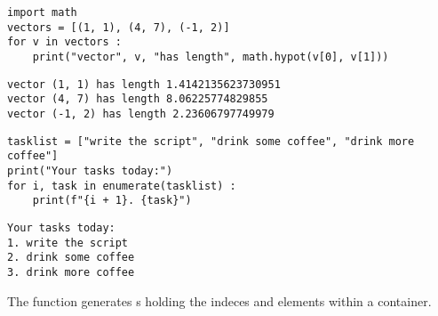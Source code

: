 
\begin{frame}[fragile]
%
\begin{codebox}
\begin{verbatim}
import math
vectors = [(1, 1), (4, 7), (-1, 2)]
for v in vectors :
    print("vector", v, "has length", math.hypot(v[0], v[1]))
\end{verbatim}
\end{codebox}
%
\begin{cmdbox}
\begin{verbatim}
vector (1, 1) has length 1.4142135623730951
vector (4, 7) has length 8.06225774829855
vector (-1, 2) has length 2.23606797749979
\end{verbatim}
\end{cmdbox}
%
\end{frame}


\begin{frame}[fragile]
%
\begin{codebox}
\begin{verbatim}
tasklist = ["write the script", "drink some coffee", "drink more coffee"]
print("Your tasks today:")
for i, task in enumerate(tasklist) :
    print(f"{i + 1}. {task}")
\end{verbatim}
\end{codebox}
%
\begin{cmdbox}
\begin{verbatim}
Your tasks today:
1. write the script
2. drink some coffee
3. drink more coffee
\end{verbatim}
\end{cmdbox}
%
\begin{hintbox}
The function  generates s holding the indeces and elements within a container.
\end{hintbox}
%
\end{frame}


